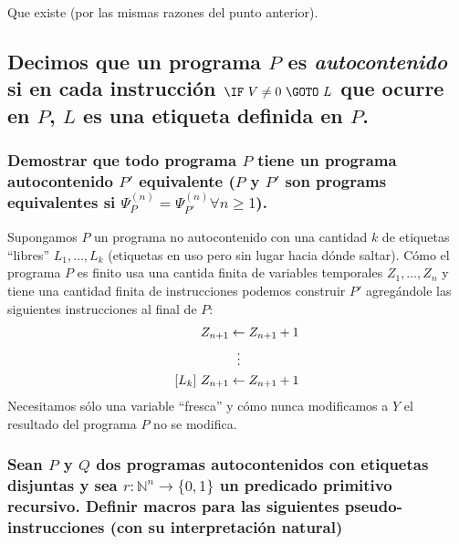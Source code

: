 \documentclass[fleqn, 11pt]{article}
\newcommand{\nat}{\mathbb{N}}
\newcommand{\into}{\leftarrow}
\begin{document}
Que existe (por las mismas razones del punto anterior).

\subsection{Decimos que un programa $P$ es \emph{autocontenido} si en cada
instrucción $\IF\ V \neq 0\ \GOTO\ L$ que ocurre en $P$, $L$ es una etiqueta
definida en $P$.}

\subsubsection{Demostrar que todo programa $P$ tiene un programa autocontenido
$P'$ equivalente ($P$ y $P'$ son programs equivalentes si
$\Psi^{(n)}_P = \Psi^{(n)}_{P'} \forall n \geq 1$).}

Supongamos $P$ un programa no autocontenido con una cantidad $k$ de etiquetas
``libres'' $L_1, \dots, L_k$ (etiquetas en uso pero sin lugar hacia dónde
saltar). Cómo el programa $P$ es finito usa una cantida finita de variables
temporales $Z_1, \dots, Z_n$ y tiene una cantidad finita de instrucciones
podemos construir $P'$ agregándole las siguientes instrucciones al final de
$P$:
\begin{align*}
	[L_1]\ &Z_{n+1} \into Z_{n+1} + 1 \\
	       & \hspace{2.7em} \vdots \\
	[L_k]\ &Z_{n+1} \into Z_{n+1} + 1
\end{align*}
Necesitamos sólo una variable ``fresca'' y cómo nunca modificamos a $Y$ el
resultado del programa $P$ no se modifica.

\subsubsection{Sean $P$ y $Q$ dos programas autocontenidos con etiquetas
disjuntas y sea $r : \nat^n \to \{0, 1\}$ un predicado primitivo recursivo.
Definir macros para las siguientes pseudo-instrucciones (con su interpretación
natural)}
\end{document}
